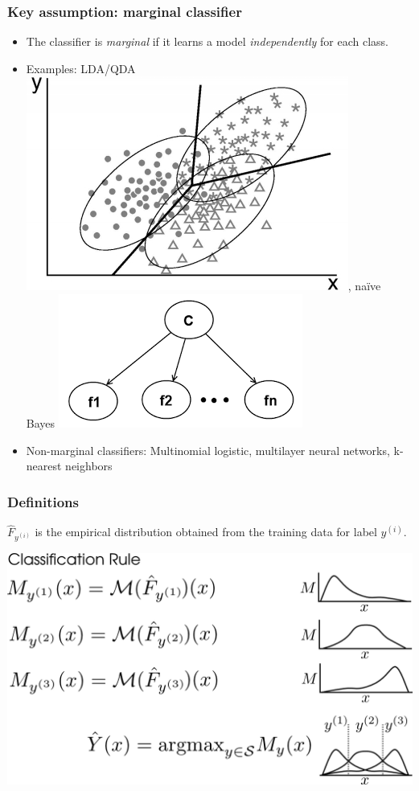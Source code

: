 \documentclass{beamer}
\begin{document}
\begin{frame}
\frametitle{Key assumption: marginal classifier}
\begin{itemize}
\item The classifier is \emph{marginal} if it learns a model \emph{independently} for each class.\pause
\item Examples: LDA/QDA \includegraphics[scale = 0.2]{discriminant.jpg}, \pause
na\"{i}ve Bayes \includegraphics[scale = 0.2]{naive_bayes.png} \pause
\item Non-marginal classifiers: Multinomial logistic, multilayer neural networks, k-nearest neighbors
\end{itemize}
\end{frame}

\begin{frame}
\frametitle{Definitions}

$\hat{F}_{y^{(i)}}$ is the empirical distribution obtained from the training data for label $y^{(i)}$.

\begin{center}
\includegraphics[scale = 0.2]{../info_theory_paper/extrapolation_figures/classification_rule.png}
\end{center}
\end{frame}
\end{document}
